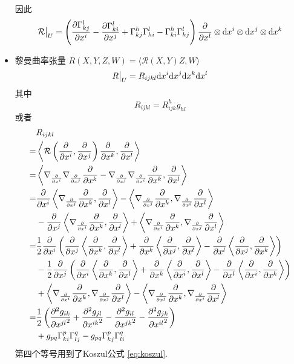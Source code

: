 \begin{itemize}
\begin{align*}
        \end{align*}
        因此
        \begin{equation*}
            \mathcal{R}\big|_U = \left(\pd{\Gamma_{kj}^{l}}{x^i} - \pd{\Gamma_{ki}^{l}}{x^j} + \Gamma_{kj}^{h}\Gamma_{hi}^{l} - \Gamma_{ki}^{h}\Gamma_{hj}^{l}\right)\pd{}{x^l}\otimes\md{x^i}\otimes\md{x^j}\otimes\md{x^k}
        \end{equation*}
        \item 黎曼曲率张量 $R(X,Y,Z,W) = \langle\mathcal{R}(X,Y)Z,W\rangle$
        \begin{equation*}
            R\big|_U = R_{ijkl}\md{x^i}\md{x^j}\md{x^k}\md{x^l}
        \end{equation*}
        其中
        \begin{equation*}
            R_{ijkl} = R_{ijk}^{h}g_{hl}
        \end{equation*}
        或者
        \begin{align*}
            & R_{ijkl} \\
            =& \left<\mathcal{R}\left(\pd{}{x^i},\pd{}{x^j}\right)\pd{}{x^k},\pd{}{x^l}\right> \\
            =& \left<\lc{\pd{}{x^i}}{\lc{\pd{}{x^j}}{\pd{}{x^k}}} - \lc{\pd{}{x^j}}{\lc{\pd{}{x^i}}{\pd{}{x^k}}},\pd{}{x^l}\right> \\
            =& \pd{}{x^i}\left<\lc{\pd{}{x^j}}{\pd{}{x^k}},\pd{}{x^l}\right> - \left<\lc{\pd{}{x^j}}{\pd{}{x^k}},\lc{\pd{}{x^i}}{\pd{}{x^l}}\right> \\
            & -\pd{}{x^j}\left<\lc{\pd{}{x^i}}{\pd{}{x^k}},\pd{}{x^l}\right> + \left<\lc{\pd{}{x^i}}{\pd{}{x^k}},\lc{\pd{}{x^j}}{\pd{}{x^l}}\right> \\
            =& \frac{1}{2}\pd{}{x^i}\left(\pd{}{x^j}\left<\pd{}{x^k},\pd{}{x^l}\right>+\pd{}{x^k}\left<\pd{}{x^j},\pd{}{x^l}\right>-\pd{}{x^l}\left<\pd{}{x^j},\pd{}{x^k}\right>\right) \\
            & -\frac{1}{2}\pd{}{x^j}\left(\pd{}{x^i}\left<\pd{}{x^k},\pd{}{x^l}\right>+\pd{}{x^k}\left<\pd{}{x^i},\pd{}{x^l}\right>-\pd{}{x^l}\left<\pd{}{x^i},\pd{}{x^k}\right>\right) \\
            & +\left<\lc{\pd{}{x^i}}{\pd{}{x^k}},\lc{\pd{}{x^j}}{\pd{}{x^l}}\right>-\left<\lc{\pd{}{x^j}}{\pd{}{x^k}},\lc{\pd{}{x^i}}{\pd{}{x^l}}\right> \\
            =& \frac{1}{2}\left(\npd{2}{g_{ik}}{x^{jl}}+\npd{2}{g_{jl}}{x^{ik}}-\npd{2}{g_{il}}{x^{jk}}-\npd{2}{g_{jk}}{x^{il}}\right) \\
            & +g_{pq}\Gamma_{ki}^{p}\Gamma_{lj}^{q}-g_{pq}\Gamma_{kj}^{p}\Gamma_{li}^{q}
        \end{align*}
        第四个等号用到了Koszul公式 \ref{eq:koszul}.
    \end{itemize}

